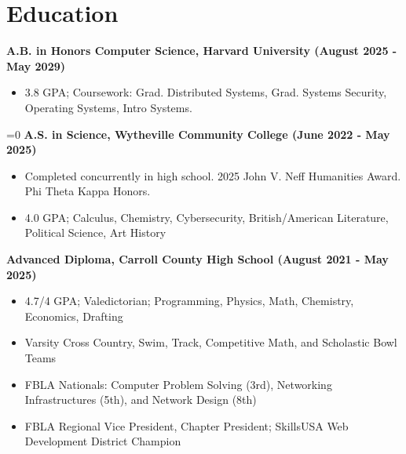 \section{Education}

\textbf{A.B. in Honors Computer Science, Harvard University \hfill (August 2025 - May 2029)}

\begin{itemize}[noitemsep]
    \item 3.8 GPA; Coursework: Grad. Distributed Systems, Grad. Systems Security, Operating Systems, Intro Systems.
\end{itemize}

\ifnum{}=0
\textbf{A.S. in Science, Wytheville Community College \hfill (June 2022 - May 2025)}

    \begin{itemize}[noitemsep]
            \item Completed concurrently in high school. 2025 John V. Neff Humanities Award. Phi Theta Kappa Honors.
            \item 4.0 GPA; Calculus, Chemistry, Cybersecurity, British/American Literature, Political Science, Art History
    \end{itemize}

    \textbf{Advanced Diploma, Carroll County High School \hfill (August 2021 - May 2025)}

    \begin{itemize}[noitemsep]
            \item 4.7/4 GPA; Valedictorian; Programming, Physics, Math, Chemistry, Economics, Drafting
            \item Varsity Cross Country, Swim, Track, Competitive Math, and Scholastic Bowl Teams
            \item FBLA Nationals: Computer Problem Solving (3rd), Networking Infrastructures (5th), and Network Design (8th)
            \item FBLA Regional Vice President, Chapter President; SkillsUSA Web Development District Champion
    \end{itemize}
\fi
